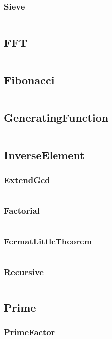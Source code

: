 \documentclass[a4paper,11pt]{article}
\begin{document}
\subsubsection{Sieve}
\inputminted[breaklines]{c++}{Template/02++Math/+Euler/+Sieve.cpp}

\subsection{FFT}
\inputminted[breaklines]{c++}{Template/02++Math/+FFT.cpp}
\subsection{Fibonacci}
\inputminted[breaklines]{c++}{Template/02++Math/+Fibonacci.cpp}
\subsection{GeneratingFunction}
\inputminted[breaklines]{c++}{Template/02++Math/+GeneratingFunction.cpp}
\subsection{InverseElement}
\subsubsection{ExtendGcd}
\inputminted[breaklines]{c++}{Template/02++Math/+InverseElement/+ExtendGcd.cpp}
\subsubsection{Factorial}
\inputminted[breaklines]{c++}{Template/02++Math/+InverseElement/+Factorial.cpp}
\subsubsection{FermatLittleTheorem}
\inputminted[breaklines]{c++}{Template/02++Math/+InverseElement/+FermatLittleTheorem.cpp}
\subsubsection{Recursive}
\inputminted[breaklines]{c++}{Template/02++Math/+InverseElement/+Recursive.cpp}

\subsection{Prime}
\subsubsection{PrimeFactor}
\inputminted[breaklines]{c++}{Template/02++Math/+Prime/+PrimeFactor.cpp}
\end{document}
